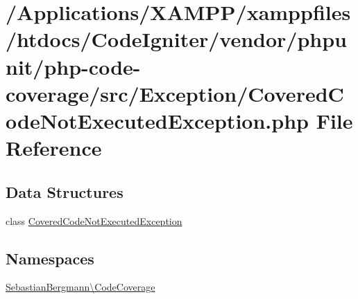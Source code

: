 \hypertarget{php-code-coverage_2src_2_exception_2_covered_code_not_executed_exception_8php}{}\section{/\+Applications/\+X\+A\+M\+P\+P/xamppfiles/htdocs/\+Code\+Igniter/vendor/phpunit/php-\/code-\/coverage/src/\+Exception/\+Covered\+Code\+Not\+Executed\+Exception.php File Reference}
\label{php-code-coverage_2src_2_exception_2_covered_code_not_executed_exception_8php}
\subsection*{Data Structures}
\begin{DoxyCompactItemize}
\item 
class \mbox{\hyperlink{class_sebastian_bergmann_1_1_code_coverage_1_1_covered_code_not_executed_exception}{Covered\+Code\+Not\+Executed\+Exception}}
\end{DoxyCompactItemize}
\subsection*{Namespaces}
\begin{DoxyCompactItemize}
\item 
 \mbox{\hyperlink{namespace_sebastian_bergmann_1_1_code_coverage}{Sebastian\+Bergmann\textbackslash{}\+Code\+Coverage}}
\end{DoxyCompactItemize}
